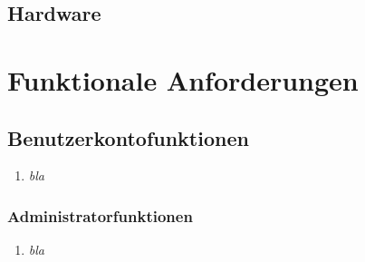 \documentclass[parskip=full,11pt]{scrartcl}
\def\threedigits#1{%
  \ifnum#1<100 0\fi
  \ifnum#1<10 0\fi
  \number#1}
\begin{document}
\subsection{Hardware}


\section{Funktionale Anforderungen}
\subsection{Benutzerkontofunktionen}
\begin{enumerate}[label={\textbf{/F\protect\threedigits{\theenumi}/}}, leftmargin=*]
\item \textit{bla}

\end{enumerate}

\subsubsection{Administratorfunktionen}
\begin{enumerate}[label={\textbf{/F\protect\threedigits{\theenumi}/}}, leftmargin=*]
\item \textit{bla}
\end{enumerate}
\end{document}

